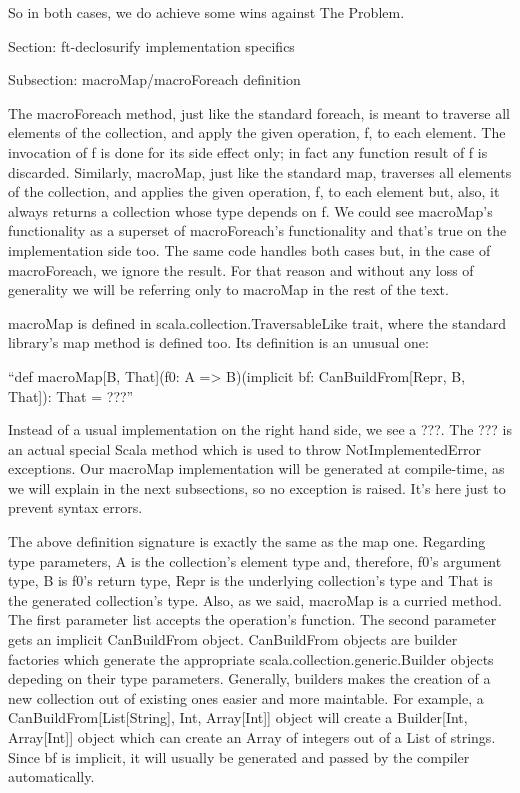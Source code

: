So in both cases, we do achieve some wins against The Problem.


Section: ft-declosurify implementation specifics

Subsection: macroMap/macroForeach definition

The macroForeach method, just like the standard foreach, is meant to traverse
all elements of the collection, and apply the given operation, f, to each
element. The invocation of f is done for its side effect only; in fact any
function result of f is discarded. Similarly, macroMap, just like the standard
map, traverses all elements of the collection, and applies the given operation,
f, to each element but, also, it always returns a collection whose type depends
on f. We could see macroMap's functionality as a superset of macroForeach's
functionality and that's true on the implementation side too. The same code
handles both cases but, in the case of macroForeach, we ignore the result. For
that reason and without any loss of generality we will be referring only to
macroMap in the rest of the text.

macroMap is defined in scala.collection.TraversableLike trait, where the
standard library's map method is defined too. Its definition is an unusual one:

``def macroMap[B, That](f0: A => B)(implicit bf: CanBuildFrom[Repr, B, That]):
That = ???''

Instead of a usual implementation on the right hand side, we see a ???. The ???
is an actual special Scala method which is used to throw NotImplementedError
exceptions. Our macroMap implementation will be generated at compile-time, as
we will explain in the next subsections, so no exception is raised. It's here
just to prevent syntax errors. 

The above definition signature is exactly the same as the map one. Regarding
type parameters, A is the collection's element type and, therefore, f0's
argument type, B is f0's return type, Repr is the underlying collection's type
and That is the generated collection's type. Also, as we said, macroMap is a
curried method. The first parameter list accepts the operation's function. The
second parameter gets an implicit CanBuildFrom object. CanBuildFrom objects are
builder factories which generate the appropriate
scala.collection.generic.Builder objects depeding on their type parameters.
Generally, builders makes the creation of a new collection out of existing ones
easier and more maintable. For example, a CanBuildFrom[List[String], Int,
Array[Int]] object will create a Builder[Int, Array[Int]] object which can
create an Array of integers out of a List of strings. Since bf is implicit, it
will usually be generated and passed by the compiler automatically.


